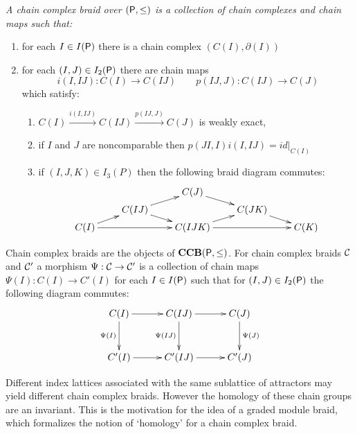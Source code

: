 \begin{defn}
{\em
A {\em chain complex braid} over $({\mathsf P},\leq)$ is a collection of chain complexes and chain maps such that:
\begin{enumerate}
\item for each $I\in I({\mathsf P})$ there is a chain complex $(C(I),\partial(I))$
\item for each $(I,J)\in I_2({\mathsf P})$ there are chain maps $$i(I,IJ):C(I)\to C(IJ)\quad\quad p(IJ,J):C(IJ)\to C(J)$$ which satisfy:
\begin{enumerate}
\item $C(I)\xrightarrow{i(I,IJ)} C(IJ)\xrightarrow{p(IJ,J)} C(J)$ is weakly exact,
\item if $I$ and $J$ are noncomparable then $p(JI,I)i(I,IJ)=id|_{C(I)}$
\item if $(I,J,K)\in I_3(P)$ then the following braid diagram commutes:
\[
\xymatrixrowsep{0.03in}
\xymatrixcolsep{0.3in}
\xymatrix{
& & C(J) \ar[dr] & &  \\
& C(IJ) \ar[ur] \ar[dr] & & C(JK) \ar[dr] &  \\
C(I) \ar[ur] \ar[rr]& & C(IJK) \ar[rr] \ar[ur]& & C(K) 
}
\]
\end{enumerate}

\end{enumerate}
}
\end{defn}

Chain complex braids are the objects of ${\bf CCB}({\mathsf P},\leq)$.  For  chain complex braids ${\mathcal C}$ and ${\mathcal C}'$ a morphism $\Psi:{\mathcal C}\to {\mathcal C}'$  is a collection of chain maps $\Psi(I):C(I)\to C'(I)$ for each $I\in I({\mathsf P})$ such that for $(I,J)\in I_2({\mathsf P})$ the following diagram commutes:
\[
\xymatrixcolsep{0.4in}
\xymatrixrowsep{0.4in}
\xymatrix{
C(I) \ar[r] \ar@{->}[d]_{\Psi(I)} & C(IJ) \ar@{->}[d]_{\Psi(IJ)} \ar[r] & C(J) \ar@{->}[d]^{\Psi(J)}  \\
C'(I) \ar[r] & C'(IJ) \ar[r] & C'(J)
}
\] 

Different index lattices associated with the same sublattice of attractors may yield different chain complex braids.  However the homology of these chain groups are an invariant.  This is the motivation for the idea of a graded module braid, which formalizes the notion of `homology' for a chain complex braid.


